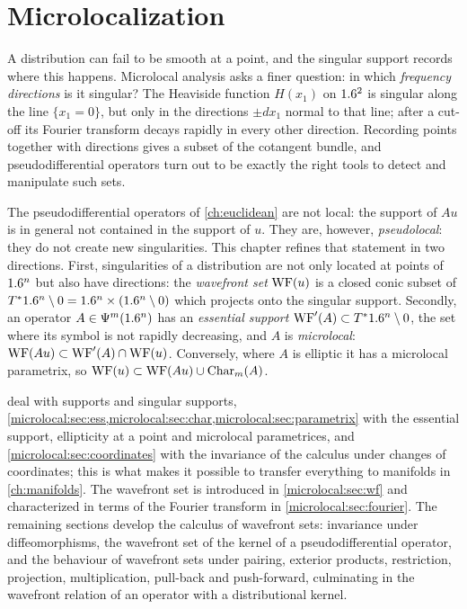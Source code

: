 \chapter{Microlocalization}\label{ch:microlocal}
\providecommand{\Tz}[1]{T^*#1\setminus0}%
\providecommand{\conesupp}{\operatorname{cone\,supp}}%
\providecommand{\Ell}{\operatorname{Ell}}%

A distribution can fail to be smooth at a point, and the singular support
records where this happens. Microlocal analysis asks a finer question: in
which \emph{frequency directions} is it singular? The Heaviside function
$H(x_1)$ on $1.6^2$ is singular along the line $\{x_1=0\}$, but only in the
directions $\pm dx_1$ normal to that line; after a cut-off its Fourier
transform decays rapidly in every other direction. Recording points together
with directions gives a subset of the cotangent bundle, and
pseudodifferential operators turn out to be exactly the right tools to
detect and manipulate such sets.

The pseudodifferential operators of \cref{ch:euclidean} are not local: the
support of $Au$ is in general not contained in the support of $u$. They are,
however, \emph{pseudolocal}: they do not create new singularities. This
chapter refines that statement in two directions. First, singularities of a
distribution are not only located at points of $1.6^n$ but also have
directions: the \emph{wavefront set} $\operatorname{WF}(u)$ is a closed conic subset of
$\Tz{\R^n}=\R^n\times(\R^n\setminus0)$ which projects onto the singular
support. Secondly, an operator $A\in\Psi^{m}(1.6^n)$ has an \emph{essential
support} $\WFp(A)\subset\Tz{\R^n}$, the set where its symbol is not rapidly
decreasing, and $A$ is \emph{microlocal}:
$\operatorname{WF}(Au)\subset\operatorname{WF}'(A)\cap\operatorname{WF}(u)$. Conversely, where $A$ is elliptic it has
a microlocal parametrix, so $\operatorname{WF}(u)\subset\operatorname{WF}(Au)\cup\operatorname{Char}_m(A)$.

 deal with supports
and singular supports, \cref{microlocal:sec:ess,microlocal:sec:char,microlocal:sec:parametrix}
with the essential support, ellipticity at a point and microlocal
parametrices, and \cref{microlocal:sec:coordinates} with the invariance of
the calculus under changes of coordinates; this is what makes it possible to
transfer everything to manifolds in \cref{ch:manifolds}. The wavefront set
is introduced in \cref{microlocal:sec:wf} and characterized in terms of the
Fourier transform in \cref{microlocal:sec:fourier}. The remaining sections
develop the calculus of wavefront sets: invariance under diffeomorphisms,
the wavefront set of the kernel of a pseudodifferential operator, and the
behaviour of wavefront sets under pairing, exterior products, restriction,
projection, multiplication, pull-back and push-forward, culminating in the
wavefront relation of an operator with a distributional kernel.

